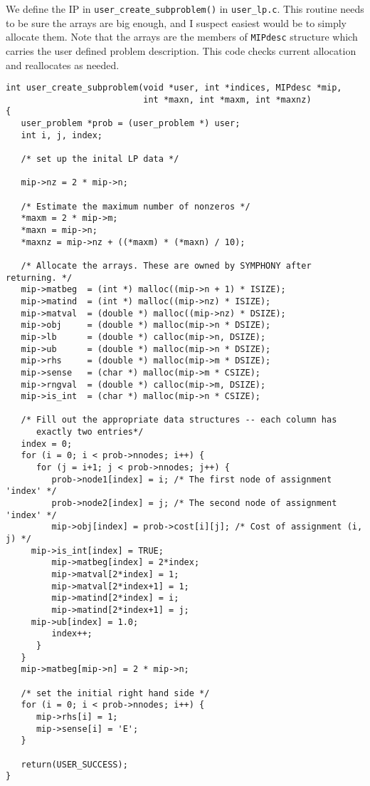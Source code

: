 \documentclass[11pt]{article}
\begin{document}
We define the IP in \texttt{user\_create\_subproblem()} in
\texttt{user\_lp.c}. This routine needs to be sure the arrays are big enough,
and I suspect easiest would be to simply allocate them. Note that the arrays
are the members of \texttt{MIPdesc} structure which carries the user defined
problem description. This code checks current allocation and reallocates as
needed.
\newpage
\begin{verbatim}
int user_create_subproblem(void *user, int *indices, MIPdesc *mip, 
                           int *maxn, int *maxm, int *maxnz)
{
   user_problem *prob = (user_problem *) user;
   int i, j, index;

   /* set up the inital LP data */

   mip->nz = 2 * mip->n;

   /* Estimate the maximum number of nonzeros */
   *maxm = 2 * mip->m;
   *maxn = mip->n;
   *maxnz = mip->nz + ((*maxm) * (*maxn) / 10);
   
   /* Allocate the arrays. These are owned by SYMPHONY after returning. */
   mip->matbeg  = (int *) malloc((mip->n + 1) * ISIZE);
   mip->matind  = (int *) malloc((mip->nz) * ISIZE);
   mip->matval  = (double *) malloc((mip->nz) * DSIZE);
   mip->obj     = (double *) malloc(mip->n * DSIZE);
   mip->lb      = (double *) calloc(mip->n, DSIZE);
   mip->ub      = (double *) malloc(mip->n * DSIZE);
   mip->rhs     = (double *) malloc(mip->m * DSIZE);
   mip->sense   = (char *) malloc(mip->m * CSIZE);
   mip->rngval  = (double *) calloc(mip->m, DSIZE);
   mip->is_int  = (char *) malloc(mip->n * CSIZE);
   
   /* Fill out the appropriate data structures -- each column has
      exactly two entries*/
   index = 0;
   for (i = 0; i < prob->nnodes; i++) {
      for (j = i+1; j < prob->nnodes; j++) {
         prob->node1[index] = i; /* The first node of assignment 'index' */
         prob->node2[index] = j; /* The second node of assignment 'index' */
         mip->obj[index] = prob->cost[i][j]; /* Cost of assignment (i, j) */
	 mip->is_int[index] = TRUE;
         mip->matbeg[index] = 2*index;
         mip->matval[2*index] = 1;
         mip->matval[2*index+1] = 1;
         mip->matind[2*index] = i;
         mip->matind[2*index+1] = j;
	 mip->ub[index] = 1.0;
         index++;
      }
   }
   mip->matbeg[mip->n] = 2 * mip->n;
   
   /* set the initial right hand side */
   for (i = 0; i < prob->nnodes; i++) {
      mip->rhs[i] = 1;
      mip->sense[i] = 'E';
   }

   return(USER_SUCCESS);
}      
\end{verbatim}
\end{document}

